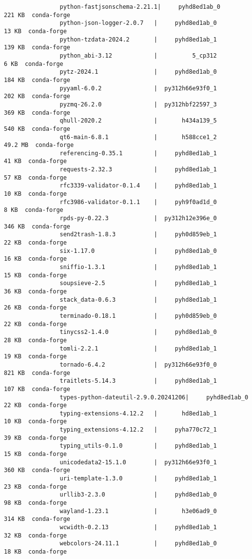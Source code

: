 \documentclass{article}
\begin{document}
\begin{itemize}
\begin{itemize}
\begin{itemize}
\begin{verbatim}
				python-fastjsonschema-2.21.1|     pyhd8ed1ab_0         221 KB  conda-forge
				python-json-logger-2.0.7   |     pyhd8ed1ab_0          13 KB  conda-forge
				python-tzdata-2024.2       |     pyhd8ed1ab_1         139 KB  conda-forge
				python_abi-3.12            |          5_cp312           6 KB  conda-forge
				pytz-2024.1                |     pyhd8ed1ab_0         184 KB  conda-forge
				pyyaml-6.0.2               |  py312h66e93f0_1         202 KB  conda-forge
				pyzmq-26.2.0               |  py312hbf22597_3         369 KB  conda-forge
				qhull-2020.2               |       h434a139_5         540 KB  conda-forge
				qt6-main-6.8.1             |       h588cce1_2        49.2 MB  conda-forge
				referencing-0.35.1         |     pyhd8ed1ab_1          41 KB  conda-forge
				requests-2.32.3            |     pyhd8ed1ab_1          57 KB  conda-forge
				rfc3339-validator-0.1.4    |     pyhd8ed1ab_1          10 KB  conda-forge
				rfc3986-validator-0.1.1    |     pyh9f0ad1d_0           8 KB  conda-forge
				rpds-py-0.22.3             |  py312h12e396e_0         346 KB  conda-forge
				send2trash-1.8.3           |     pyh0d859eb_1          22 KB  conda-forge
				six-1.17.0                 |     pyhd8ed1ab_0          16 KB  conda-forge
				sniffio-1.3.1              |     pyhd8ed1ab_1          15 KB  conda-forge
				soupsieve-2.5              |     pyhd8ed1ab_1          36 KB  conda-forge
				stack_data-0.6.3           |     pyhd8ed1ab_1          26 KB  conda-forge
				terminado-0.18.1           |     pyh0d859eb_0          22 KB  conda-forge
				tinycss2-1.4.0             |     pyhd8ed1ab_0          28 KB  conda-forge
				tomli-2.2.1                |     pyhd8ed1ab_1          19 KB  conda-forge
				tornado-6.4.2              |  py312h66e93f0_0         821 KB  conda-forge
				traitlets-5.14.3           |     pyhd8ed1ab_1         107 KB  conda-forge
				types-python-dateutil-2.9.0.20241206|     pyhd8ed1ab_0          22 KB  conda-forge
				typing-extensions-4.12.2   |       hd8ed1ab_1          10 KB  conda-forge
				typing_extensions-4.12.2   |     pyha770c72_1          39 KB  conda-forge
				typing_utils-0.1.0         |     pyhd8ed1ab_1          15 KB  conda-forge
				unicodedata2-15.1.0        |  py312h66e93f0_1         360 KB  conda-forge
				uri-template-1.3.0         |     pyhd8ed1ab_1          23 KB  conda-forge
				urllib3-2.3.0              |     pyhd8ed1ab_0          98 KB  conda-forge
				wayland-1.23.1             |       h3e06ad9_0         314 KB  conda-forge
				wcwidth-0.2.13             |     pyhd8ed1ab_1          32 KB  conda-forge
				webcolors-24.11.1          |     pyhd8ed1ab_0          18 KB  conda-forge

\end{verbatim}
\end{itemize}
\end{itemize}
\end{itemize}
\end{document}
